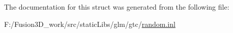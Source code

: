 The documentation for this struct was generated from the following file\+:\begin{DoxyCompactItemize}
\item 
F\+:/\+Fusion3\+D\+\_\+work/src/static\+Libs/glm/gtc/\hyperlink{random_8inl}{random.\+inl}\end{DoxyCompactItemize}
